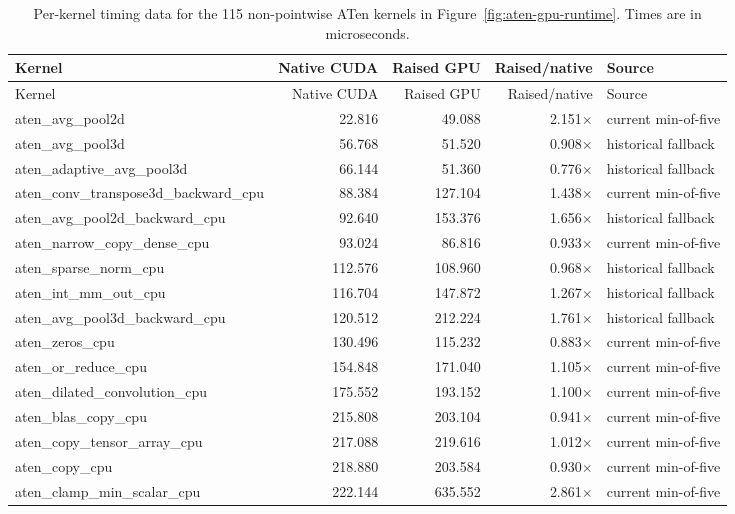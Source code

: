 \begin{longtable}{lrrrl}
  \caption{Per-kernel timing data for the 115 non-pointwise ATen kernels in Figure~\ref{fig:aten-gpu-runtime}. Times are in microseconds.}\label{tab:aten-nonpointwise-timings} \\
  \toprule
  Kernel & Native CUDA & Raised GPU & Raised/native & Source \\
  \midrule
  \endfirsthead
  \toprule
  Kernel & Native CUDA & Raised GPU & Raised/native & Source \\
  \midrule
  \endhead
  aten\_avg\_pool2d & 22.816 & 49.088 & 2.151$\times$ & current min-of-five \\
  aten\_avg\_pool3d & 56.768 & 51.520 & 0.908$\times$ & historical fallback \\
  aten\_adaptive\_avg\_pool3d & 66.144 & 51.360 & 0.776$\times$ & historical fallback \\
  aten\_conv\_transpose3d\_backward\_cpu & 88.384 & 127.104 & 1.438$\times$ & current min-of-five \\
  aten\_avg\_pool2d\_backward\_cpu & 92.640 & 153.376 & 1.656$\times$ & historical fallback \\
  aten\_narrow\_copy\_dense\_cpu & 93.024 & 86.816 & 0.933$\times$ & current min-of-five \\
  aten\_sparse\_norm\_cpu & 112.576 & 108.960 & 0.968$\times$ & historical fallback \\
  aten\_int\_mm\_out\_cpu & 116.704 & 147.872 & 1.267$\times$ & historical fallback \\
  aten\_avg\_pool3d\_backward\_cpu & 120.512 & 212.224 & 1.761$\times$ & historical fallback \\
  aten\_zeros\_cpu & 130.496 & 115.232 & 0.883$\times$ & current min-of-five \\
  aten\_or\_reduce\_cpu & 154.848 & 171.040 & 1.105$\times$ & current min-of-five \\
  aten\_dilated\_convolution\_cpu & 175.552 & 193.152 & 1.100$\times$ & current min-of-five \\
  aten\_blas\_copy\_cpu & 215.808 & 203.104 & 0.941$\times$ & current min-of-five \\
  aten\_copy\_tensor\_array\_cpu & 217.088 & 219.616 & 1.012$\times$ & current min-of-five \\
  aten\_copy\_cpu & 218.880 & 203.584 & 0.930$\times$ & current min-of-five \\
  aten\_clamp\_min\_scalar\_cpu & 222.144 & 635.552 & 2.861$\times$ & current min-of-five \\

\end{longtable}
